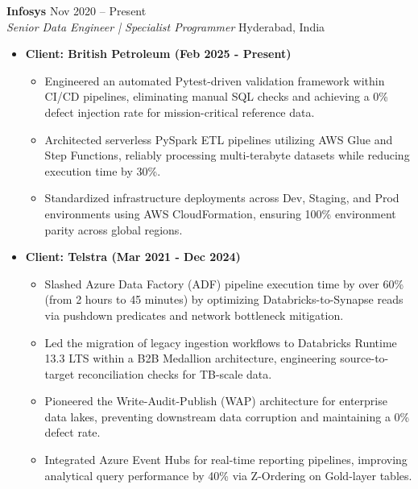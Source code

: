 \documentclass[10pt, letterpaper]{article}
\begin{document}
\noindent \textbf{Infosys} \hfill Nov 2020 – Present \\
\textit{Senior Data Engineer | Specialist Programmer} \hfill Hyderabad, India
\begin{itemize}
    \setlength{\itemsep}{1pt}
    \setlength{\leftmargin}{0.25in}
    
    \item \textbf{Client: British Petroleum (Feb 2025 - Present)}
    \vspace{-4pt}
    \begin{itemize}
        \setlength{\itemsep}{1pt}
        \setlength{\leftmargin}{0.25in}
        \item Engineered an automated Pytest-driven validation framework within CI/CD pipelines, eliminating manual SQL checks and achieving a 0\% defect injection rate for mission-critical reference data.
        \item Architected serverless PySpark ETL pipelines utilizing AWS Glue and Step Functions, reliably processing multi-terabyte datasets while reducing execution time by 30\%.
        \item Standardized infrastructure deployments across Dev, Staging, and Prod environments using AWS CloudFormation, ensuring 100\% environment parity across global regions.
    \end{itemize}
    
    \vspace{2pt}
    \item \textbf{Client: Telstra (Mar 2021 - Dec 2024)}
    \vspace{-4pt}
    \begin{itemize}
        \setlength{\itemsep}{1pt}
        \setlength{\leftmargin}{0.25in}
        \item Slashed Azure Data Factory (ADF) pipeline execution time by over 60\% (from 2 hours to 45 minutes) by optimizing Databricks-to-Synapse reads via pushdown predicates and network bottleneck mitigation.
        \item Led the migration of legacy ingestion workflows to Databricks Runtime 13.3 LTS within a B2B Medallion architecture, engineering source-to-target reconciliation checks for TB-scale data.
        \item Pioneered the Write-Audit-Publish (WAP) architecture for enterprise data lakes, preventing downstream data corruption and maintaining a 0\% defect rate.
        \item Integrated Azure Event Hubs for real-time reporting pipelines, improving analytical query performance by 40\% via Z-Ordering on Gold-layer tables.
    \end{itemize}


\end{itemize}
\end{document}
